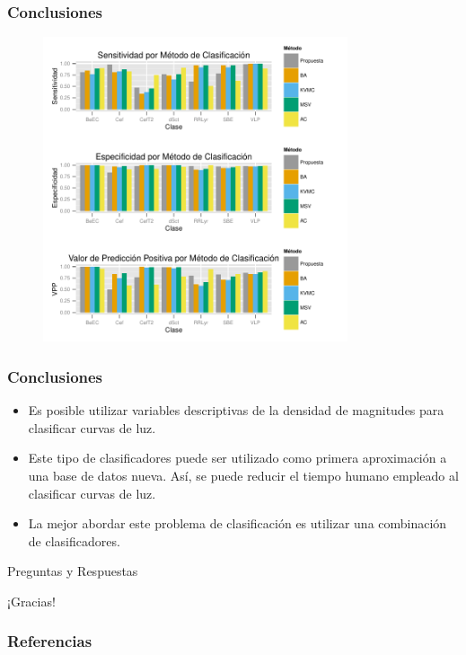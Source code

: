 \documentclass{beamer}
\begin{document}
\begin{frame}
\frametitle{Conclusiones}
  \begin{figure}
    \centering
    \includegraphics[width=0.8\textwidth]{./img/resumen.pdf}
    \caption{}
  \end{figure}
\end{frame}

\begin{frame}
  \frametitle{Conclusiones}
  \begin{itemize}
  \item Es posible utilizar variables descriptivas de la densidad de magnitudes para clasificar curvas de luz.
  \item Este tipo de clasificadores puede ser utilizado como primera aproximación a una base de datos nueva. Así, se puede reducir el tiempo humano empleado al clasificar curvas de luz. 
  \item La mejor abordar este problema de clasificación es utilizar una combinación de clasificadores.
  \end{itemize}
\end{frame}

\begin{frame}
  Preguntas y Respuestas
\end{frame}

\begin{frame}
  ¡Gracias!
\end{frame}


\begin{frame}[allowframebreaks]
  \frametitle{Referencias}
  
  
\end{frame}
\end{document}
